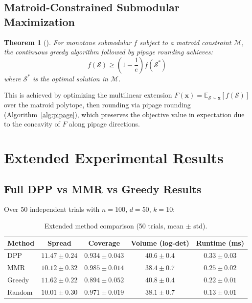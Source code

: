 \documentclass[11pt]{article}
\newtheorem{theorem}{Theorem}[section]
\begin{document}
\subsection{Matroid-Constrained Submodular Maximization}

\begin{theorem}[\citet{calinescu2011maximizing}]
For monotone submodular $f$ subject to a matroid constraint $\mathcal{M}$,
the continuous greedy algorithm followed by pipage rounding achieves:
\begin{equation}
f(\mathcal{S}) \geq \left(1 - \frac{1}{e}\right) f(\mathcal{S}^*)
\end{equation}
where $\mathcal{S}^*$ is the optimal solution in $\mathcal{M}$.
\end{theorem}

This is achieved by optimizing the multilinear extension
$F(\mathbf{x}) = \mathbb{E}_{\mathcal{S} \sim \mathbf{x}}[f(\mathcal{S})]$
over the matroid polytope, then rounding via pipage rounding
(Algorithm~\ref{alg:pipage}), which preserves the objective value in
expectation due to the concavity of $F$ along pipage directions.

\section{Extended Experimental Results}
\label{app:extended}

\subsection{Full DPP vs MMR vs Greedy Results}

Over 50 independent trials with $n{=}100$, $d{=}50$, $k{=}10$:

\begin{table}[H]
\centering
\caption{Extended method comparison (50 trials, mean $\pm$ std).}
\label{tab:extended-comparison}
\begin{tabular}{lcccc}
\toprule
\textbf{Method} & \textbf{Spread} & \textbf{Coverage} & \textbf{Volume (log-det)} & \textbf{Runtime (ms)} \\
\midrule
DPP       & $11.47 \pm 0.24$ & $0.934 \pm 0.043$ & $40.6 \pm 0.4$ & $0.33 \pm 0.03$ \\
MMR       & $10.12 \pm 0.32$ & $\mathbf{0.985 \pm 0.014}$ & $38.4 \pm 0.7$ & $0.25 \pm 0.02$ \\
Greedy    & $\mathbf{11.62 \pm 0.22}$ & $0.894 \pm 0.052$ & $\mathbf{40.8 \pm 0.4}$ & $0.22 \pm 0.01$ \\
Random    & $10.01 \pm 0.30$ & $0.971 \pm 0.019$ & $38.1 \pm 0.7$ & $0.13 \pm 0.01$ \\
\bottomrule
\end{tabular}
\end{table}
\end{document}
